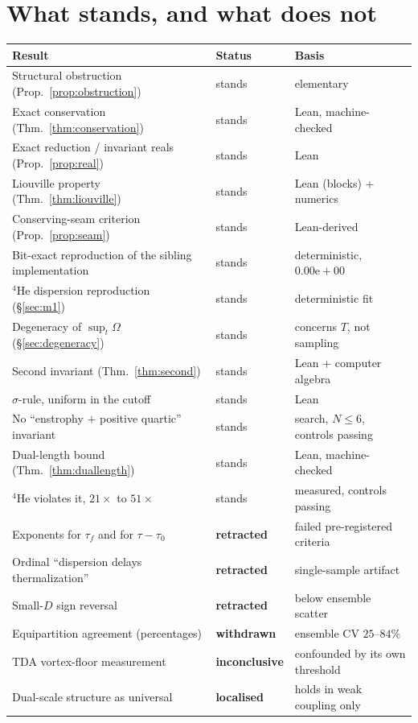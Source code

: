 \documentclass[11pt,a4paper]{article}
\theoremstyle{definition}
\theoremstyle{remark}
\begin{document}
\section{What stands, and what does not}
\label{sec:standing}

\begin{center}
\small
\begin{tabular}{@{}p{6.4cm}p{2.4cm}p{5.4cm}@{}}
\toprule
Result & Status & Basis \\
\midrule
Structural obstruction (Prop.~\ref{prop:obstruction}) & stands & elementary \\
Exact conservation (Thm.~\ref{thm:conservation}) & stands & Lean, machine-checked \\
Exact reduction / invariant reals (Prop.~\ref{prop:real}) & stands & Lean \\
Liouville property (Thm.~\ref{thm:liouville}) & stands & Lean (blocks) + numerics \\
Conserving-seam criterion (Prop.~\ref{prop:seam}) & stands & Lean-derived \\
Bit-exact reproduction of the sibling implementation & stands & deterministic, $0.00\mathrm{e}{+}00$ \\
$^4$He dispersion reproduction (\S\ref{sec:m1}) & stands & deterministic fit \\
Degeneracy of $\sup_t\Omega$ (\S\ref{sec:degeneracy}) & stands & concerns $T$, not sampling \\
Second invariant (Thm.~\ref{thm:second}) & stands & Lean + computer algebra \\
$\sigma$-rule, uniform in the cutoff & stands & Lean \\
No ``enstrophy $+$ positive quartic'' invariant & stands & search, $N\le6$, controls passing \\
Dual-length bound (Thm.~\ref{thm:duallength}) & stands & Lean, machine-checked \\
$^4$He violates it, $21\times$ to $51\times$ & stands & measured, controls passing \\
\midrule
Exponents for $\tau_f$ and for $\tau-\tau_0$ & \textbf{retracted} & failed pre-registered criteria \\
Ordinal ``dispersion delays thermalization'' & \textbf{retracted} & single-sample artifact \\
Small-$D$ sign reversal & \textbf{retracted} & below ensemble scatter \\
Equipartition agreement (percentages) & \textbf{withdrawn} & ensemble CV $25$--$84\%$ \\
TDA vortex-floor measurement & \textbf{inconclusive} & confounded by its own threshold \\
Dual-scale structure as universal & \textbf{localised} & holds in weak coupling only \\
\bottomrule
\end{tabular}
\end{center}
\end{document}
